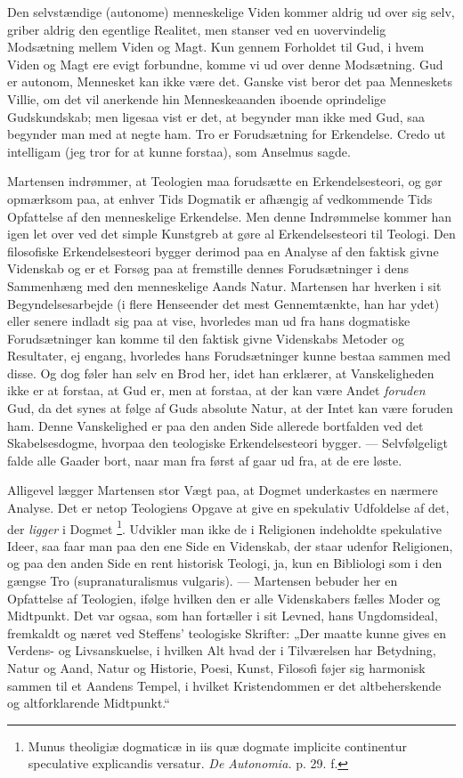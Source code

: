 \documentclass[12pt,a4paper,openany]{book}
\newcommand{\opage}[1]{\marginnote{\footnotesize\textit{[#1]}}}
\begin{document}
Den selvstændige (autonome) menneskelige Viden kommer aldrig ud over sig selv,
griber aldrig den egentlige Realitet, men stanser ved en uovervindelig
Modsætning mellem Viden og Magt. Kun gennem Forholdet til Gud, i hvem Viden og
Magt ere evigt forbundne, komme vi ud over denne Modsætning. Gud er autonom,
Mennesket kan ikke være det. Ganske vist beror det paa Menneskets Villie, om
det vil anerkende hin Menneskeaanden iboende oprindelige Gudskundskab; men
ligesaa vist er det, at begynder man ikke med Gud, saa begynder man med at
negte ham. Tro er Forudsætning for Erkendelse. Credo ut intelligam (jeg tror
for at kunne forstaa), som Anselmus sagde.

Martensen indrømmer, at Teologien maa forudsætte en Erkendelsesteori, og gør
opmærksom paa, at enhver Tids Dogmatik er afhængig af vedkommende Tids
Opfattelse af den menneskelige Erkendelse. Men denne Indrømmelse kommer han
igen let over ved det simple Kunstgreb at gøre al Erkendelsesteori til Teologi.
Den filosofiske Erkendelsesteori bygger derimod paa en Analyse af den faktisk
givne Videnskab og er et Forsøg paa at fremstille dennes Forudsætninger i dens
Sammenhæng med den menneskelige Aands Natur. Martensen har hverken i sit
Begyndelsesarbejde (i flere Henseender det mest Gennemtænkte, han har ydet)
eller senere indladt sig paa at vise, hvorledes man ud fra hans dogmatiske
Forudsætninger kan komme til den faktisk givne Videnskabs Metoder og
Resultater, ej engang, hvorledes hans Forudsætninger kunne bestaa sammen med
disse. Og dog føler han selv en Brod her, idet han erklærer, at Vanskeligheden
ikke er at forstaa, at Gud er, men at forstaa, at der kan være
\setcounter{footnote}{0}%
\opage{139}Andet \textit{foruden} Gud, da det synes at følge af Guds absolute
Natur, at der Intet kan være foruden ham. Denne Vanskelighed er paa den anden
Side allerede bortfalden ved det Skabelsesdogme, hvorpaa den teologiske
Erkendelsesteori bygger. --- Selvfølgeligt falde alle Gaader bort, naar man fra
først af gaar ud fra, at de ere løste.

Alligevel lægger Martensen stor Vægt paa, at Dogmet underkastes en nærmere
Analyse. Det er netop Teologiens Opgave at give en spekulativ Udfoldelse af
det, der \textit{ligger} i Dogmet%
\footnote[1]{Munus theoligiæ dogmaticæ in iis quæ dogmate implicite continentur
speculative explicandis versatur. \textit{De Autonomia.} p. 29. f.}. Udvikler
man ikke de i Religionen indeholdte spekulative Ideer, saa faar man paa den ene
Side en Videnskab, der staar udenfor Religionen, og paa den anden Side en rent
historisk Teologi, ja, kun en Bibliologi som i den gængse Tro
(supranaturalismus vulgaris). --- Martensen bebuder her en Opfattelse af
Teologien, ifølge hvilken den er alle Videnskabers fælles Moder og Midtpunkt.
Det var ogsaa, som han fortæller i sit Levned, hans Ungdomsideal, fremkaldt og
næret ved Steffens' teologiske Skrifter: „Der maatte kunne gives en Verdens- og
Livsanskuelse, i hvilken Alt hvad der i Tilværelsen har Betydning, Natur og
Aand, Natur og Historie, Poesi, Kunst, Filosofi føjer sig harmonisk sammen til
et Aandens Tempel, i hvilket Kristendommen er det altbeherskende og
altforklarende Midtpunkt.“
\end{document}

